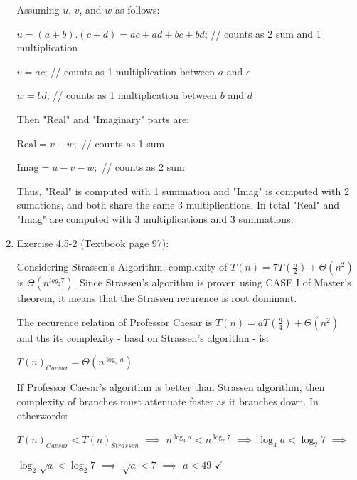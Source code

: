 \documentclass[11pt]{article}
\begin{document}
\begin{enumerate}
	Assuming $u$, $v$, and $w$ as follows: 
	
	\hspace{10mm} $ u = (a+b).(c+d)=ac+ad+bc+bd$;  // counts as 2 sum and 1 multiplication 
	
	\hspace{10mm} $ v = ac$;  // counts as 1 multiplication between $a$ and $c$
		
	\hspace{10mm} $ w = bd$;  // counts as 1 multiplication between $b$ and $d$
	
	Then "Real" and "Imaginary" parts are:
	
	\hspace{10mm} $\mathrm{Real} = v-w;$  // counts as 1 sum   
		
	\hspace{10mm} $\mathrm{Imag} = u-v-w;$  // counts as 2 sum 
	
	Thus, "Real" is computed with 1 summation and "Imag" is computed with 2 sumations, and both share the same 3 multiplications. In total "Real" and "Imag" are computed with 3 multiplications and 3 summations.
	
	
	
	
	


\item Exercise 4.5-2 (Textbook page 97): 

	Considering Strassen's Algorithm, complexity of $T(n)=7T(\frac{n}{2})+\Theta(n^{2})$ is $\Theta(n^{log_2{7}})$. Since Strassen's algorithm is proven using CASE I of Master's theorem, it means that the Strassen recurence is root dominant. 
	
	The recurence relation of Professor Caesar is $T(n)=aT(\frac{n}{4})+\Theta(n^{2})$ and ths its complexity - basd on Strassen's algorithm - is: 
	
	\hspace{10mm} $T(n)_{Caesar} = \Theta(n^{\log_4{a}})$	
	
	If Professor Caesar's algorithm is better than Strassen algorithm, then complexity of branches must attenuate faster as it branches down. In otherwords:
	
	\hspace{10mm} $T(n)_{Caesar} < T(n)_{Strassen}$
	$\overset{\mathrm{}}{\implies}$
	$n^{\log_4{a}} < n^{\log_2{7}}$
	$\overset{\mathrm{}}{\implies}$
	$\log_4{a} < \log_2{7}$
	$\overset{\mathrm{}}{\implies}$
	
	\hspace{10mm} $\log_2{\sqrt{a}} < \log_2{7}$
	$\overset{\mathrm{}}{\implies}$
	$\sqrt{a}<7$
	$\overset{\mathrm{}}{\implies}$
	$a<49$
	$\checkmark$
	

\end{enumerate}
\end{document}
